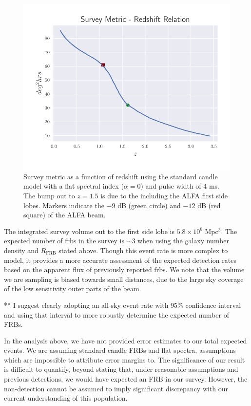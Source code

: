 \documentclass[a4paper,fleqn,usenatbib]{mnras}
\begin{document}
\begin{figure}
    \includegraphics[width=1.0\linewidth]{figures/full_sefd_z_relation.pdf}
    \caption{Survey metric as a function of redshift using the standard candle
    model with a flat spectral index ($\alpha=0$) and pulse width of 4 ms. The
    bump out to $z=1.5$ is due to the including the ALFA first side lobes.
    Markers indicate the $-9$ dB (green circle) and $-12$ dB (red square) of the
    ALFA beam.
    }
    \label{fig:full_sefd_z}
\end{figure}

The integrated survey volume out to the first side lobe is $5.8 \times
10^6$ Mpc$^3$. The expected number of \glspl{frb} in the survey is
$\sim 3$ when using the galaxy number density and $R_{\textrm{FRB}}$
stated above. Though this event rate is more complex to model, it
provides a more accurate assessment of the expected detection rates
based on the apparent flux of previously reported \glspl{frb}. We note
that the volume we are sampling is biased towards small distances, due
to the large sky coverage of the low sensitivity outer parts of the
beam.


** I suggest clearly adopting an all-sky event rate
with 95\% confidence interval and using that interval
to more robustly determine the expected number of FRBs.

In the analysis above, we have not provided error estimates to our
total expected events. We are assuming standard candle FRBs and flat
spectra, assumptions which are impossible to attribute error margins
to. The significance of our result is difficult to quantify, beyond
stating that, under reasonable assumptions and previous detections, we
would have expected an FRB in our survey. However, the non-detection
cannot be assumed to imply significant discrepancy with our current
understanding of this population.
\end{document}
